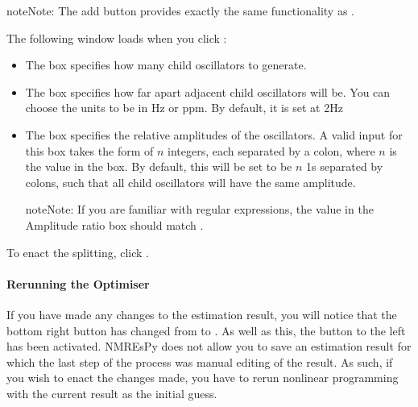 \documentclass[letterpaper,10pt,english]{sphinxmanual}
\let\sphinxpxdimen\pdfpxdimen\else\newdimen\sphinxpxdimen
\begin{document}
\begin{sphinxadmonition}{note}{Note:}
\sphinxAtStartPar
The add button provides exactly the same functionality as
{\hyperref[\detokenize{references/core:nmrespy.core.Estimator.split_oscillator}]{}}.
\end{sphinxadmonition}

\sphinxAtStartPar
The following window loads when you click :

\noindent{\hspace*{\fill}\sphinxincludegraphics[width=250\sphinxpxdimen]{{split_window}.png}\hspace*{\fill}}
\begin{itemize}
\item {} 
\sphinxAtStartPar
The  box specifies how many child oscillators
to generate.

\item {} 
\sphinxAtStartPar
The  box specifies how far apart adjacent child
oscillators will be. You can choose the units to be in Hz or ppm. By
default, it is set at 2Hz

\item {} 
\sphinxAtStartPar
The  box specifies the relative amplitudes of the
oscillators. A valid input for this box takes the form of \(n\)
integers, each separated by a colon, where \(n\) is the value in
the  box. By default, this will be set to be
\(n\) 1s separated by colons, such that all child oscillators will
have the same amplitude.

\begin{sphinxadmonition}{note}{Note:}
\sphinxAtStartPar
If you are familiar with regular expressions, the value in the Amplitude
ratio box should match .
\end{sphinxadmonition}

\end{itemize}

\sphinxAtStartPar
To enact the splitting, click .


\paragraph{Re\sphinxhyphen{}running the Optimiser}
\label{\detokenize{gui/usage/result:re-running-the-optimiser}}
\sphinxAtStartPar
If you have made any changes to the estimation result, you will notice that
the bottom right button has changed from  to . As well
as this, the  button to the left has been activated. NMR\sphinxhyphen{}EsPy does
not allow you to save an estimation result for which the last step of the
process was manual editing of the result. As such, if you wish to enact the
changes made, you have to re\sphinxhyphen{}run nonlinear programming with the current result
as the initial guess.
\end{document}
